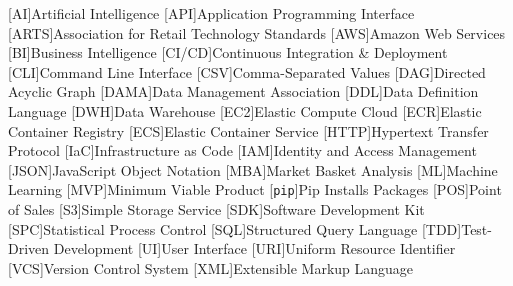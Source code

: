 
\singlespacing
\begin{acronym}[MMMMMM]
	[AI]{Artificial Intelligence}
	[API]{Application Programming Interface}
	[ARTS]{Association for Retail Technology Standards}
	[AWS]{Amazon Web Services}
	[BI]{Business Intelligence}
	[CI/CD]{Continuous Integration \& Deployment}
	[CLI]{Command Line Interface}
	[CSV]{Comma-Separated Values}
	[DAG]{Directed Acyclic Graph}
	[DAMA]{Data Management Association}
	[DDL]{Data Definition Language}
	[DWH]{Data Warehouse}
	[EC2]{Elastic Compute Cloud}
	[ECR]{Elastic Container Registry}
	[ECS]{Elastic Container Service}
	[HTTP]{Hypertext Transfer Protocol}
	[IaC]{Infrastructure as Code}
	[IAM]{Identity and Access Management}
	[JSON]{JavaScript Object Notation}
	[MBA]{Market Basket Analysis}
	[ML]{Machine Learning}
	[MVP]{Minimum Viable Product}
	[\texttt{pip}]{Pip Installs Packages}
	[POS]{Point of Sales}
	[S3]{Simple Storage Service}
	[SDK]{Software Development Kit}
	[SPC]{Statistical Process Control}
	[SQL]{Structured Query Language}
	[TDD]{Test-Driven Development}
	[UI]{User Interface}
	[URI]{Uniform Resource Identifier}
	[VCS]{Version Control System}
	[XML]{Extensible Markup Language}
\end{acronym}
\onehalfspacing